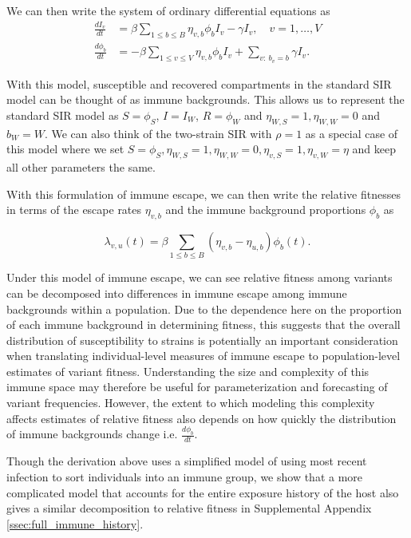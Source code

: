\documentclass[11pt,oneside,letterpaper]{article}
\newcommand{\wt}{W}
\newcommand{\varEscape}{\eta}
\newcommand{\varTransmission}{\rho}
\begin{document}
We can then write the system of ordinary differential equations as
\begin{align*}
    \frac{d I_{v}}{dt} &= \beta \sum_{1\leq b \leq B} \varEscape_{v, b} \phi_{b} I_{v} - \gamma I_{v}, \quad v = 1, \ldots, V\\
    \frac{d \phi_{b}}{dt} &= - \beta \sum_{1\leq v \leq V} \varEscape_{v,b}\phi_{b} I_{v} +  \sum_{v:\ b_{v} = b} \gamma I_{v}.
\end{align*}

With this model, susceptible and recovered compartments in the standard SIR model can be thought of as immune backgrounds.
This allows us to represent the standard SIR model as $S = \phi_{S}$, $I = I_{\wt}$, $R = \phi_{\wt}$ and $\varEscape_{\wt, S} = 1, \varEscape_{\wt, \wt} = 0$ and $b_{\wt} = \wt$.
We can also think of the two-strain SIR with $\varTransmission = 1$ as a special case of this model where we set $S = \phi_{S}, \varEscape_{\wt, S} = 1, \varEscape_{\wt, \wt} = 0, \varEscape_{v, S} = 1, \varEscape_{v, \wt} = \varEscape$ and keep all other parameters the same.

With this formulation of immune escape, we can then write the relative fitnesses in terms of the escape rates $\varEscape_{v,b}$ and the immune background proportions $\phi_{b}$ as

\begin{equation} \label{eq:escape_relative_fitness}
    \lambda_{v, u}(t) = \beta \sum_{1\leq b \leq B}(\varEscape_{v,b} - \varEscape_{u,b}) \phi_{b}(t).
\end{equation}

Under this model of immune escape, we can see relative fitness among variants can be decomposed into differences in immune escape among immune backgrounds within a population.
Due to the dependence here on the proportion of each immune background in determining fitness, this suggests that the overall distribution of susceptibility to strains is potentially an important consideration when translating individual-level measures of immune escape to population-level estimates of variant fitness.
Understanding the size and complexity of this immune space may therefore be useful for parameterization and forecasting of variant frequencies.
However, the extent to which modeling this complexity affects estimates of relative fitness also depends on how quickly the distribution of immune backgrounds change i.e. $\frac{d\phi_{b}}{dt}$.

Though the derivation above uses a simplified model of using most recent infection to sort individuals into an immune group, we show that a more complicated model that accounts for the entire exposure history of the host also gives a similar decomposition to relative fitness in Supplemental Appendix \ref{ssec:full_immune_history}.
\end{document}
